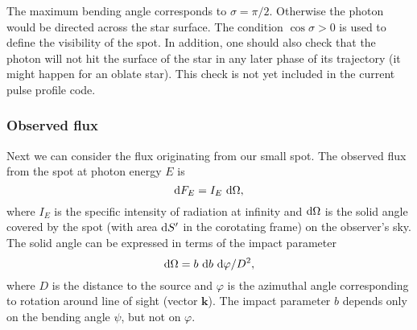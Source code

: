 \documentclass{wihuri}
\def\be{\begin{equation}}
\def\ee{\end{equation}}
\def\d{{\rm d}}
\def\Dop{\delta}
\def\ene{E}%
\newcommand{\bmath}[1]{\boldsymbol{#1}}
\begin{document}
The maximum bending angle corresponds to $\sigma=\pi/2$. Otherwise the photon would be directed across the star surface. 
The condition $\cos \sigma>0$ is used to define the visibility of the spot. In addition, one should also check that the photon will not hit the surface of the star in any later phase of its trajectory (it might happen for an oblate star). This check is not yet included in the current pulse profile code.


\subsubsection{Observed flux}

Next we can consider the flux originating from our small spot. The observed flux from the spot at photon energy $E$ is
\be
\label{eq:dF_E2}
  \d F_{\ene}=I_{\ene}\ \d\Omega,
\ee
where $I_{\ene}$ is the specific intensity of radiation at infinity and $\d\Omega$ is
the solid angle covered by the spot (with area $\d S'$ in the corotating frame) on the observer's sky.
The solid angle can be expressed in terms of the impact parameter \cite{pechenick}
\be
\d\Omega=b\ \d b\ \d\varphi/D^2,
\ee
where $D$ is the distance to the source and $\varphi$ is the azimuthal
angle corresponding to rotation around line of sight (vector $\bmath{k}$).
The impact parameter $b$ depends only on the bending angle $\psi$, but not on $\varphi$.

\end{document}
